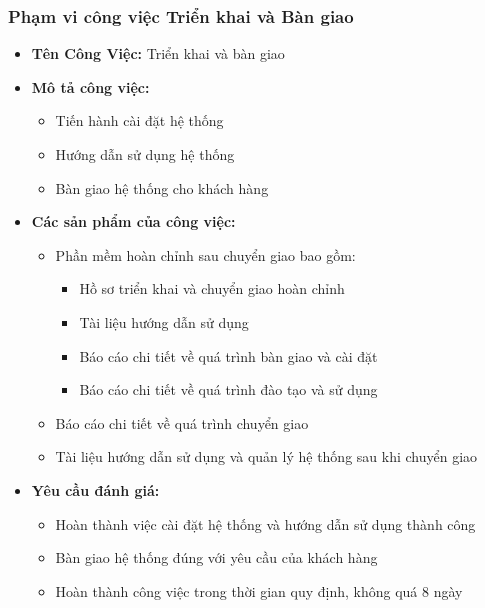 \subsubsection{Phạm vi công việc Triển khai và Bàn giao}
\begin{itemize}
    \item \textbf{Tên Công Việc:} Triển khai và bàn giao
    \item \textbf{Mô tả công việc:}
    \begin{itemize}
        \item Tiến hành cài đặt hệ thống
        \item Hướng dẫn sử dụng hệ thống
        \item Bàn giao hệ thống cho khách hàng
    \end{itemize}
    \item \textbf{Các sản phẩm của công việc:}
    \begin{itemize}
        \item Phần mềm hoàn chỉnh sau chuyển giao bao gồm:
        \begin{itemize}
            \item Hồ sơ triển khai và chuyển giao hoàn chỉnh
            \item Tài liệu hướng dẫn sử dụng
            \item Báo cáo chi tiết về quá trình bàn giao và cài đặt
            \item Báo cáo chi tiết về quá trình đào tạo và sử dụng
        \end{itemize}
        \item Báo cáo chi tiết về quá trình chuyển giao
        \item Tài liệu hướng dẫn sử dụng và quản lý hệ thống sau khi chuyển giao
    \end{itemize}
    \item \textbf{Yêu cầu đánh giá:}
    \begin{itemize}
        \item Hoàn thành việc cài đặt hệ thống và hướng dẫn sử dụng thành công
        \item Bàn giao hệ thống đúng với yêu cầu của khách hàng
        \item Hoàn thành công việc trong thời gian quy định, không quá 8 ngày
    \end{itemize}
\end{itemize}
